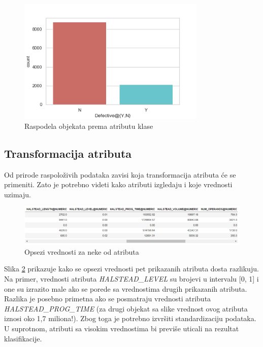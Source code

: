 \documentclass[12pt,oneside]{memoir}
\begin{document}
\begin{figure}[!ht]
  \centering
  \includegraphics[width=0.80\textwidth]{raspodela.png}
  \caption{Raspodela objekata prema atributu klase}
  \label{fig:raspodela}
\end{figure}
	 
\subsection{Transformacija atributa}

Od prirode raspoloživih podataka zavisi koja transformacija atributa će se primeniti. Zato je potrebno videti kako atributi izgledaju i koje vrednosti uzimaju. 

\begin{figure}[!ht]
  \centering
  \includegraphics[width=1\textwidth]{atr_opsezi.png}
  \caption{Opsezi vrednosti za neke od atributa}
  \label{fig:atr_opsezi}
\end{figure}

Slika \ref{fig:atr_opsezi} prikazuje kako se opsezi vrednosti pet prikazanih atributa dosta razlikuju. Na primer, vrednosti atributa \textit{HALSTEAD\_LEVEL} su brojevi u intervalu [0, 1] i one su izrazito male ako se porede sa vrednostima drugih prikazanih atributa. Razlika je posebno primetna ako se posmatraju vrednosti atributa \textit{HALSTEAD\_PROG\_TIME} (za drugi objekat sa slike vrednost ovog atributa iznosi oko 1,7 miliona!). Zbog toga je potrebno izvršiti standardizaciju podataka. U suprotnom, atributi sa visokim vrednostima bi previše uticali na rezultat klasifikacije. 
\end{document}
